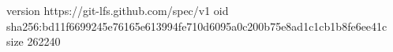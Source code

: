 version https://git-lfs.github.com/spec/v1
oid sha256:bd11f6699245e76165e613994fe710d6095a0c200b75e8ad1c1cb1b8fe6ee41c
size 262240
